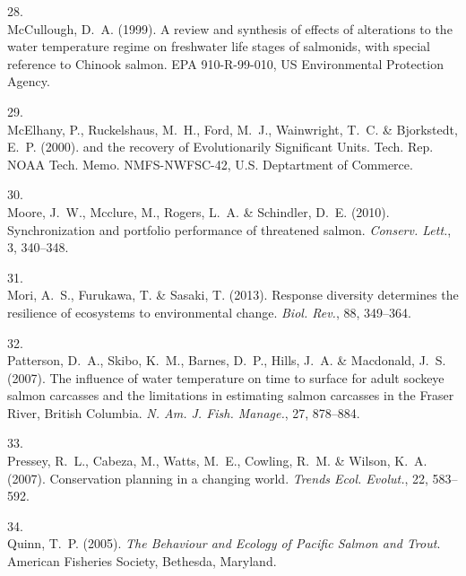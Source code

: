 \documentclass[11pt]{article}
\begin{document}
\begin{spacing}{1.6}
\begin{thebibliography}{50}
28.\\
McCullough, D.~A. (1999).
\newblock A review and synthesis of effects of alterations to the water
  temperature regime on freshwater life stages of salmonids, with special
  reference to {Chinook} salmon.
\newblock EPA 910-R-99-010, US Environmental Protection Agency.

29.\\
McElhany, P., Ruckelshaus, M.~H., Ford, M.~J., Wainwright, T.~C. \& Bjorkstedt,
  E.~P. (2000).
 and the recovery of {Evolutionarily
  Significant Units}.
\newblock Tech. Rep. NOAA Tech. Memo. NMFS-NWFSC-42, U.S. Deptartment of
  Commerce.

30.\\
Moore, J.~W., Mcclure, M., Rogers, L.~A. \& Schindler, D.~E. (2010).
\newblock Synchronization and portfolio performance of threatened salmon.
\newblock \emph{Conserv. Lett.}, 3, 340--348.

31.\\
Mori, A.~S., Furukawa, T. \& Sasaki, T. (2013).
\newblock Response diversity determines the resilience of ecosystems to
  environmental change.
\newblock \emph{Biol. Rev.}, 88, 349--364.

32.\\
Patterson, D.~A., Skibo, K.~M., Barnes, D.~P., Hills, J.~A. \& Macdonald, J.~S.
  (2007).
\newblock The influence of water temperature on time to surface for adult
  sockeye salmon carcasses and the limitations in estimating salmon carcasses
  in the {Fraser River, British Columbia}.
\newblock \emph{N. Am. J. Fish. Manage.}, 27, 878--884.

33.\\
Pressey, R.~L., Cabeza, M., Watts, M.~E., Cowling, R.~M. \& Wilson, K.~A.
  (2007).
\newblock Conservation planning in a changing world.
\newblock \emph{Trends Ecol. Evolut.}, 22, 583--592.

34.\\
Quinn, T.~P. (2005).
\newblock \emph{The Behaviour and Ecology of Pacific Salmon and Trout}.
\newblock American Fisheries Society, Bethesda, Maryland.


\end{thebibliography}
\end{spacing}
\end{document}

